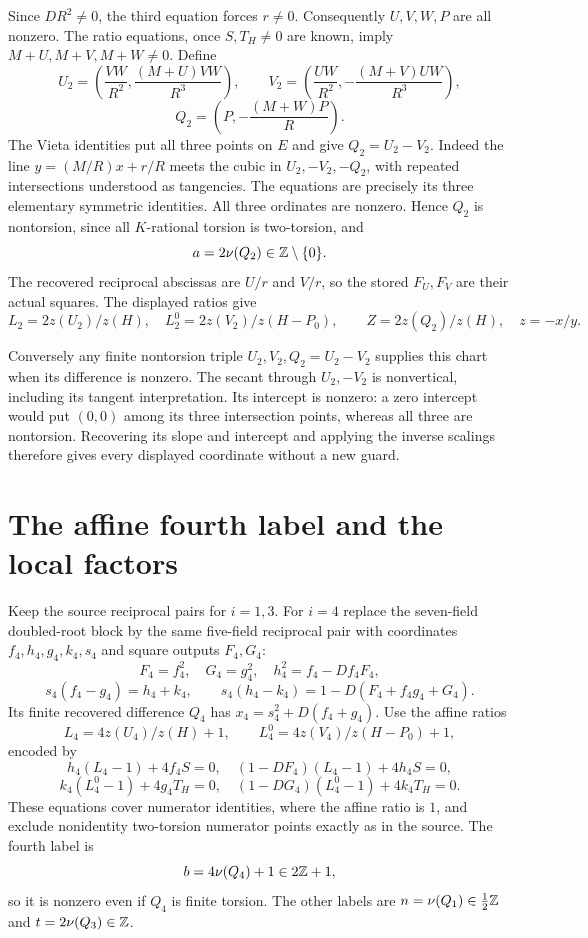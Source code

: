 \documentclass[11pt]{article}
\begin{document}
Since $DR^2\ne0$, the third equation forces $r\ne0$. Consequently
$U,V,W,P$ are all nonzero. The ratio equations, once $S,T_H\ne0$ are
known, imply $M+U,M+V,M+W\ne0$. Define
\[
 U_2=\left(\frac{VW}{R^2},\frac{(M+U)VW}{R^3}\right),\qquad
 V_2=\left(\frac{UW}{R^2},-\frac{(M+V)UW}{R^3}\right),
\]
\[
                  Q_2=\left(P,-\frac{(M+W)P}{R}\right).
\]
The Vieta identities put all three points on $E$ and give
$Q_2=U_2-V_2$. Indeed the line $y=(M/R)x+r/R$ meets the cubic in
$U_2,-V_2,-Q_2$, with repeated intersections understood as tangencies.
The equations are precisely its three elementary symmetric identities.
All three ordinates are nonzero. Hence $Q_2$ is nontorsion, since all
$K$-rational torsion is two-torsion, and
\[
                         a=2\nu(Q_2)\in\mathbb Z\setminus\{0\}.
\]
The recovered reciprocal abscissas are $U/r$ and $V/r$, so the stored
$F_U,F_V$ are their actual squares. The displayed ratios give
\[
 L_2=2z(U_2)/z(H),\quad L_2^0=2z(V_2)/z(H-P_0),
 \qquad Z=2z(Q_2)/z(H),\quad z=-x/y.
\]

Conversely any finite nontorsion triple $U_2,V_2,Q_2=U_2-V_2$ supplies
this chart when its difference is nonzero. The secant through
$U_2,-V_2$ is nonvertical, including its tangent interpretation.
Its intercept is nonzero: a zero intercept would put $(0,0)$ among
its three intersection points, whereas all three are nontorsion.
Recovering its slope and intercept and applying the inverse scalings
therefore gives every displayed coordinate without a new guard.

\section*{The affine fourth label and the local factors}
Keep the source reciprocal pairs for $i=1,3$. For $i=4$ replace the
seven-field doubled-root block by the same five-field reciprocal pair
with coordinates $f_4,h_4,g_4,k_4,s_4$ and square outputs $F_4,G_4$:
\[
 F_4=f_4^2,\quad G_4=g_4^2,\quad h_4^2=f_4-Df_4F_4,
\]
\[
 s_4(f_4-g_4)=h_4+k_4,\qquad
 s_4(h_4-k_4)=1-D(F_4+f_4g_4+G_4).
\]
Its finite recovered difference $Q_4$ has
$x_4=s_4^2+D(f_4+g_4)$. Use the affine ratios
\[
 L_4=4z(U_4)/z(H)+1,\qquad
 L_4^0=4z(V_4)/z(H-P_0)+1,
\]
encoded by
\[
 h_4(L_4-1)+4f_4S=0,\quad(1-DF_4)(L_4-1)+4h_4S=0,
\]
\[
 k_4(L_4^0-1)+4g_4T_H=0,\quad
 (1-DG_4)(L_4^0-1)+4k_4T_H=0.
\]
These equations cover numerator identities, where the affine ratio is
$1$, and exclude nonidentity two-torsion numerator points exactly as in
the source. The fourth label is
\[
                       b=4\nu(Q_4)+1\in2\mathbb Z+1,
\]
so it is nonzero even if $Q_4$ is finite torsion. The other labels are
$n=\nu(Q_1)\in\tfrac12\mathbb Z$ and $t=2\nu(Q_3)\in\mathbb Z$.
\end{document}
